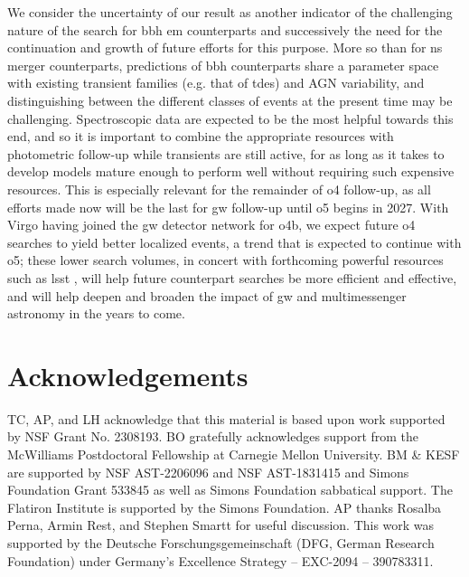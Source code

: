 \documentclass[twocolumn]{aastex631}
\begin{document}
We consider the uncertainty of our result as another indicator of the challenging nature of the search for \gls{bbh} \gls{em} counterparts and successively the need for the continuation and growth of future efforts for this purpose.
More so than for \gls{ns} merger counterparts, predictions of \gls{bbh} counterparts share a parameter space with existing transient families (e.g. that of \glspl{tde}) and AGN variability, and distinguishing between the different classes of events at the present time may be challenging.
Spectroscopic data are expected to be the most helpful towards this end, and so it is important to combine the appropriate resources with photometric follow-up while transients are still active, for as long as it takes to develop models mature enough to perform well without requiring such expensive resources.
This is especially relevant for the remainder of \gls{o4} follow-up, as all efforts made now will be the last  for \gls{gw} follow-up until \gls{o5} begins in 2027.
With Virgo having joined the \gls{gw} detector network for \gls{o4}b, we expect future \gls{o4} searches to yield better localized events, a trend that is expected to continue with \gls{o5}; these lower search volumes, in concert with forthcoming powerful resources such as \gls{lsst} \citep{ivezicLSSTScienceDrivers2019}, will help future counterpart searches be more efficient and effective, and will help deepen and broaden the impact of \gls{gw} and multimessenger astronomy in the years to come.

\section*{Acknowledgements}

TC, AP, and LH acknowledge that this material is based upon work supported by NSF Grant No. 2308193. BO gratefully acknowledges support from the McWilliams Postdoctoral Fellowship at Carnegie Mellon University. BM \& KESF are supported by NSF AST-2206096 and NSF AST-1831415 and Simons Foundation Grant 533845 as well as Simons Foundation sabbatical support. The Flatiron Institute is supported by the Simons Foundation. AP thanks Rosalba Perna, Armin Rest, and Stephen Smartt for useful discussion. This work was supported by the Deutsche Forschungsgemeinschaft (DFG, German Research Foundation) under Germany's Excellence Strategy – EXC-2094 – 390783311.
\end{document}
